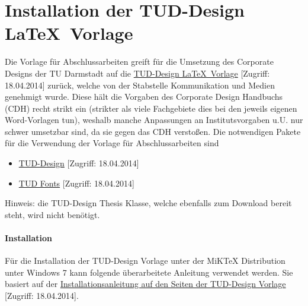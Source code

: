	\section{Installation der TUD-Design \LaTeX\ Vorlage}
		Die Vorlage für Abschlussarbeiten greift für die Umsetzung des Corporate Designs der TU Darmstadt auf die \href{http://exp1.fkp.physik.tu-darmstadt.de/tuddesign/}{TUD-Design \LaTeX\ Vorlage} [Zugriff: 18.04.2014] zurück, welche von der Stabstelle Kommunikation und Medien genehmigt wurde. Diese hält die Vorgaben des Corporate Design Handbuchs (CDH) recht strikt ein (strikter als viele Fachgebiete dies bei den jeweils eigenen Word-Vorlagen tun), weshalb manche Anpassungen an Institutsvorgaben u.U. nur schwer umsetzbar sind, da sie gegen das CDH verstoßen.\newline		
		Die notwendigen Pakete für die Verwendung der Vorlage für Abschlussarbeiten sind
		\begin{itemize}
			\item	\href{http://exp1.fkp.physik.tu-darmstadt.de/tuddesign/latex/latex-tuddesign/latex-tuddesign_0.0.20100410.zip}{TUD-Design} [Zugriff: 18.04.2014]
			\item	\href{http://exp1.fkp.physik.tu-darmstadt.de/tuddesign/latex/tudfonts-tex/tudfonts-tex_0.0.20090806.zip}{TUD Fonts} [Zugriff: 18.04.2014]
		\end{itemize}
		Hinweis: die TUD-Design Thesis Klasse, welche ebenfalls zum Download bereit steht, wird nicht benötigt.
		
		\paragraph{Installation}
			\noindent Für die Installation der TUD-Design Vorlage unter der MiKTeX Distribution unter Windows 7 kann folgende überarbeitete Anleitung verwendet werden. Sie basiert auf der \href{http://exp1.fkp.physik.tu-darmstadt.de/tuddesign/Win7_miktex29.html}{Installationsanleitung auf den Seiten der TUD-Design Vorlage} [Zugriff: 18.04.2014].
			
